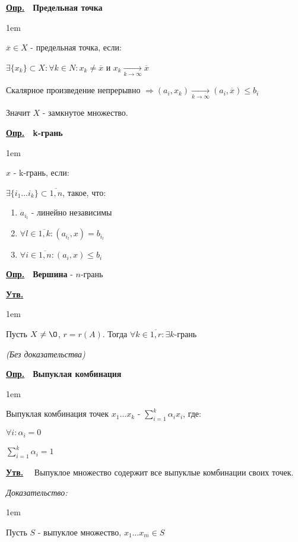 \documentclass[11pt]{article}
\newenvironment{inlinedf}[1]{
  \underline{\textbf{Опр.}}\ \ \textbf{#1} - }{
}
\newenvironment{df}[1]{
  \underline{\textbf{Опр.}}\ \ \textbf{#1}
  
  \begin{adjustwidth}{1em}{}
}{
  \end{adjustwidth}
}
\newenvironment{proof}{
  \textit{Доказательство:}
    
  \begin{adjustwidth}{1em}{}
}{
  \end{adjustwidth}
}
\newenvironment{statement}{
  \underline{\textbf{Утв.}}\ \ }{
  
}
\newenvironment{mlstatement}{
  \underline{\textbf{Утв.}}\ \ 
  
  \begin{adjustwidth}{1em}{}
}{
  \end{adjustwidth}
}
\begin{document}
\begin{sloppypar}
\begin{df}{Предельная точка}
  $\overline{x} \in X$ - предельная точка, если:
  
  $\exists \{x_k\} \subset X: \forall k \in N: x_k \neq \overline{x}$ и $x_k \xrightarrow[k \to \infty]{} \overline{x}$
\end{df}

Скалярное произведение непрерывно $\Rightarrow (a_i, x_k) \xrightarrow[k \to \infty]{} (a_i, \overline{x}) \leq b_i$

Значит $X$ - замкнутое множество.

\begin{df}{k-грань}
  $x$ - k-грань, если:

  $\exists \{i_1 \dots i_k\} \subset \overline{1, n}$, такое, что:
  
  \begin{enumerate}
    \item $a_{i_l}$ - линейно независимы
    \item $\forall l \in \overline{1, k}: (a_{i_l}, x) = b_{i_l}$
    \item $\forall i \in \overline{1, n}: (a_i, x) \leq b_i$
  \end{enumerate}
\end{df}

\begin{inlinedf}{Вершина}
  $n$-грань
\end{inlinedf}

\begin{mlstatement}
  Пусть $X \neq \O$, $r = r(A)$. Тогда $\forall k \in \overline{1, r}: \exists k$-грань
  
  \textit{(Без доказательства)}
\end{mlstatement}


\begin{df}{Выпуклая комбинация}
  Выпуклая комбинация точек $x_1 \dots x_k$ - $\sum_{i = 1}^k \alpha_i x_i$, где:
  
  $\forall i: \alpha_i = 0$
  
  $\sum_{i = 1}^k \alpha_i = 1$
\end{df}

\begin{statement}
  Выпуклое множество содержит все выпуклые комбинации своих точек.
\end{statement}
\begin{proof}
  Пусть $S$ - выпуклое множество, $x_1 \dots x_m \in S$
  

\end{proof}
\end{sloppypar}
\end{document}
